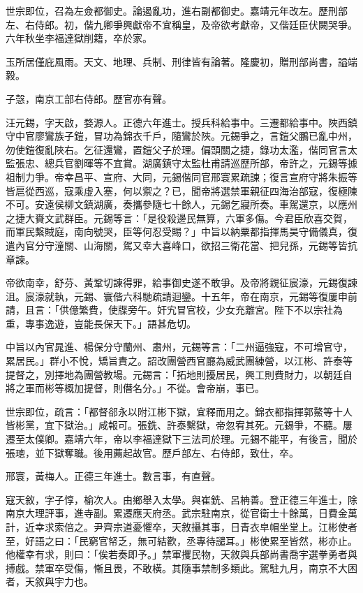 \begin{pinyinscope}
世宗即位，召為左僉都御史。論遏亂功，進右副都御史。嘉靖元年改左。歷刑部左、右侍郎。初，偕九卿爭興獻帝不宜稱皇，及帝欲考獻帝，又偕廷臣伏闕哭爭。六年秋坐李福達獄削籍，卒於家。

玉所居僅庇風雨。天文、地理、兵制、刑律皆有論著。隆慶初，贈刑部尚書，謚端毅。

子愨，南京工部右侍郎。歷官亦有聲。

汪元錫，字天啟，婺源人。正德六年進士。授兵科給事中。三遷都給事中。陜西鎮守中官廖鸞族子鎧，冒功為錦衣千戶，隨鸞於陜。元錫爭之，言鎧父鵬已亂中州，勿使鎧復亂陜右。乞征還鸞，置鎧父子於理。偏頭關之捷，錄功太濫，偕同官言太監張忠、總兵官劉暉等不宜賞。湖廣鎮守太監杜甫請巡歷所部，帝許之，元錫等據祖制力爭。帝幸昌平、宣府、大同，元錫偕同官邢寰累疏諫；復言宣府守將朱振等皆扈從西巡，寇乘虛入塞，何以禦之？已，聞帝將選禁軍親征四海治部寇，復極陳不可。安遠侯柳文鎮湖廣，奏攜參隨七十餘人，元錫乞寢所奏。車駕還京，以應州之捷大賚文武群臣。元錫等言：「是役殺邊民無算，六軍多傷。今君臣欣喜交賀，而軍民繫賊庭，南向號哭，臣等何忍受賜？」中旨以納粟都指揮馬昊守備儀真，復遣內官分守潼關、山海關，駕又幸大喜峰口，欲招三衛花當、把兒孫，元錫等皆抗章諫。

帝欲南幸，舒芬、黃鞏切諫得罪，給事御史遂不敢爭。及帝將親征宸濠，元錫復諫沮。宸濠就執，元錫、寰偕六科馳疏請迴鑾。十五年，帝在南京，元錫等復屢申前請，且言：「供億繁費，使牒旁午。奸宄冒官校，少女充離宮。陛下不以宗社為重，專事逸遊，豈能長保天下。」語甚危切。

中旨以內官晁進、楊保分守蘭州、肅州，元錫等言：「二州逼強寇，不可增官守，累居民。」群小不悅，矯旨責之。詔改團營西官廳為威武團練營，以江彬、許泰等提督之，別擇地為團營教場。元錫言：「拓地則擾居民，興工則費財力，以朝廷自將之軍而彬等概加提督，則僭名分。」不從。會帝崩，事已。

世宗即位，疏言：「都督郤永以附江彬下獄，宜釋而用之。錦衣都指揮郭鰲等十人皆彬黨，宜下獄治。」咸報可。張銑、許泰繫獄，帝忽宥其死。元錫爭，不聽。屢遷至太僕卿。嘉靖六年，帝以李福達獄下三法司於理。元錫不能平，有後言，聞於張璁，並下獄奪職。後用薦起故官。歷戶部左、右侍郎，致仕，卒。

邢寰，黃梅人。正德三年進士。數言事，有直聲。

寇天敘，字子惇，榆次人。由鄉舉入太學。與崔銑、呂柟善。登正德三年進士，除南京大理評事，進寺副。累遷應天府丞。武宗駐南京，從官衛士十餘萬，日費金萬計，近幸求索倍之。尹齊宗道憂懼卒，天敘攝其事，日青衣皁帽坐堂上。江彬使者至，好語之曰：「民窮官帑乏，無可結歡，丞專待譴耳。」彬使累至皆然，彬亦止。他權幸有求，則曰：「俟若奏即予。」禁軍攫民物，天敘與兵部尚書喬宇選拳勇者與搏戲。禁軍卒受傷，慚且畏，不敢橫。其隨事禁制多類此。駕駐九月，南京不大困者，天敘與宇力也。


\end{pinyinscope}
